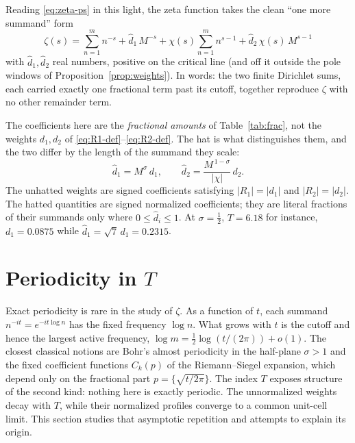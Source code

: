 \documentclass[11pt]{article}
\theoremstyle{definition}
\begin{document}
Reading \eqref{eq:zeta-ps} in this light, the zeta function takes the
clean ``one more summand'' form
\begin{equation}\label{eq:zeta-clean}
\boxed{\;
\zeta(s)=\sum_{n=1}^{m} n^{-s} + \hat d_1\,M^{-s}
        + \chi(s)\sum_{n=1}^{m} n^{s-1} + \hat d_2\,\chi(s)\,M^{s-1}
\;}
\end{equation}
with $\hat d_1,\hat d_2$ real numbers, positive on the critical line (and off it
outside the pole windows of Proposition~\ref{prop:weights}). In words: the two finite Dirichlet sums,
each carried exactly one fractional term past its cutoff, together
reproduce $\zeta$ with no other remainder term.

The coefficients here are the \emph{fractional amounts} of
Table~\ref{tab:frac}, not the weights $d_1,d_2$ of
\eqref{eq:R1-def}--\eqref{eq:R2-def}. The hat is what distinguishes them,
and the two differ by the length of the summand they scale:
\begin{equation}\label{eq:frac-vs-weight}
\hat d_1=M^{\sigma}\,d_1,
\qquad
\hat d_2=\frac{M^{\,1-\sigma}}{|\chi|}\,d_2.
\end{equation}
The unhatted weights are signed coefficients satisfying
$|R_{1}|=|d_1|$ and $|R_{2}|=|d_2|$. The hatted quantities are signed
normalized coefficients; they are literal fractions of their summands only
where $0\leq\hat d_i\leq1$. At
$\sigma=\tfrac12$, $T=6.18$ for instance, $d_1=0.0875$ while
$\hat d_1=\sqrt7\,d_1=0.2315$.

\section{Periodicity in \texorpdfstring{$T$}{T}}\label{sec:periodicity}

Exact periodicity is rare in the study of $\zeta$. As a function of $t$,
each summand $n^{-it}=e^{-it\log n}$ has the fixed frequency $\log n$.
What grows with $t$ is the cutoff and hence the largest active frequency,
$\log m=\tfrac12\log(t/(2\pi))+o(1)$. The closest
classical notions are Bohr's almost periodicity in the half-plane
$\sigma>1$ \cite[Ch.~XI]{Titchmarsh1986} and the fixed coefficient functions $C_k(p)$ of the
Riemann--Siegel expansion, which depend only on the fractional part
$p=\bigl\{\sqrt{t/2\pi}\bigr\}$. The index $T$ exposes structure of the second kind:
nothing here is exactly periodic. The unnormalized weights decay with $T$,
while their normalized profiles converge to a common unit-cell limit. This
section studies that asymptotic repetition and attempts to explain its origin.
\end{document}

